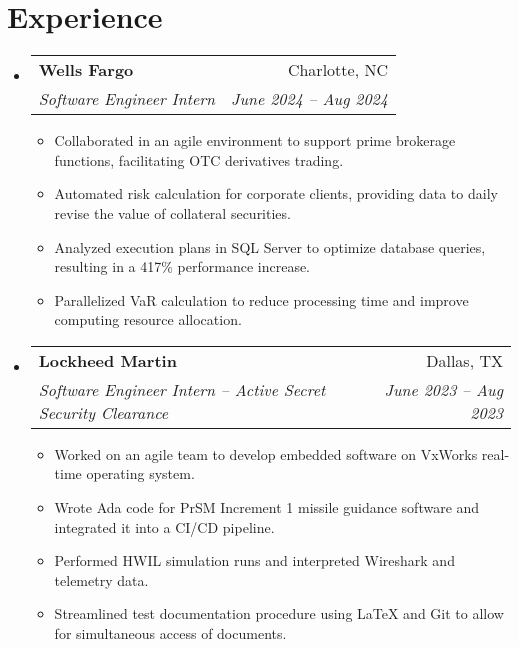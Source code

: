 \documentclass[letterpaper,11pt]{article}
\makeatletter
\newcommand{\resumeItemExperience}[1]{
  \item\small{
    {#1 \vspace{-2pt}}
  }
}
\newcommand{\resumeSubheading}[4]{
  \vspace{-1pt}\item
    \begin{tabular*}{0.97\textwidth}{l@{\extracolsep{\fill}}r}
      \textbf{#1} & #2 \\
      \textit{\small#3} & \textit{\small #4} \\
    \end{tabular*}\vspace{-6pt}
}
\newcommand{\resumeSubHeadingListStart}{\begin{itemize}[leftmargin=*, label={}]}
\newcommand{\resumeSubHeadingListEnd}{\end{itemize}}
\newcommand{\resumeItemListStart}{\begin{itemize}}
\newcommand{\resumeItemListEnd}{\end{itemize}\vspace{-5pt}}
\makeatother
\begin{document}
\section{Experience}
  \resumeSubHeadingListStart
    \resumeSubheading
      {Wells Fargo}{Charlotte, NC}
      {Software Engineer Intern}{June 2024 -- Aug 2024}
      \resumeItemListStart
        \resumeItemExperience
          {Collaborated in an agile environment to support prime brokerage functions, facilitating OTC derivatives trading.}
        \resumeItemExperience
          {Automated risk calculation for corporate clients, providing data to daily revise the value of collateral securities.}
        \resumeItemExperience
          {Analyzed execution plans in SQL Server to optimize database queries, resulting in a 417\% performance increase.}
        \resumeItemExperience
          {Parallelized VaR calculation to reduce processing time and improve computing resource allocation.}
        \resumeItemListEnd
    \resumeSubheading
      {Lockheed Martin}{Dallas, TX}
      {Software Engineer Intern -- Active Secret Security Clearance}{June 2023 -- Aug 2023}
      \resumeItemListStart
        \resumeItemExperience
          {Worked on an agile team to develop embedded software on VxWorks real-time operating system.}
        \resumeItemExperience
          {Wrote Ada code for PrSM Increment 1 missile guidance software and integrated it into a CI/CD pipeline.}
        \resumeItemExperience
          {Performed HWIL simulation runs and interpreted Wireshark and telemetry data.}
        \resumeItemExperience
          {Streamlined test documentation procedure using LaTeX and Git to allow for simultaneous access of documents.}
        \resumeItemListEnd
  \resumeSubHeadingListEnd

\end{document}
